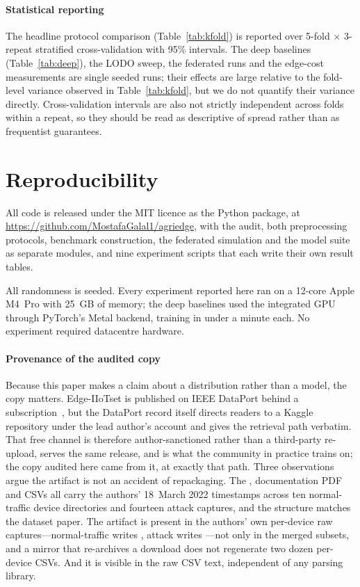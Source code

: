 \paragraph{Statistical reporting} The headline protocol comparison
(Table~\ref{tab:kfold}) is reported over 5-fold $\times$ 3-repeat stratified
cross-validation with 95\% intervals. The deep baselines
(Table~\ref{tab:deep}), the LODO sweep, the federated runs and the edge-cost
measurements are single seeded runs; their effects are large relative
to the fold-level variance observed in Table~\ref{tab:kfold}, but we do not
quantify their variance directly. Cross-validation intervals are also not
strictly independent across folds within a repeat, so they should be read as
descriptive of spread rather than as frequentist guarantees.

\section{Reproducibility}
\label{sec:repro}

All code is released under the MIT licence as the  Python
package, at \url{https://github.com/MostafaGalal1/agriedge}, with the audit,
both preprocessing protocols, benchmark construction, the federated simulation
and the model suite as separate modules, and nine experiment scripts that each
write their own result tables.

All randomness is seeded. Every experiment reported here ran on a 12-core Apple
M4~Pro with 25~GB of memory; the deep baselines used the integrated GPU through
PyTorch's Metal backend, training in under a minute each. No experiment
required datacentre hardware.

\paragraph{Provenance of the audited copy} Because this paper makes a claim
about a distribution rather than a model, the copy matters. Edge-IIoTset is
published on IEEE DataPort behind a subscription~\cite{ferrag2022dataport}, but
the DataPort record itself directs readers to a Kaggle repository under the
lead author's account and gives the retrieval path verbatim. That free channel
is therefore author-sanctioned rather than a third-party re-upload, serves the
same release, and is what the community in practice trains on; the copy audited
here came from it, at exactly that path. Three observations argue the artifact
is not an accident of repackaging. The , documentation PDF and
CSVs all carry the authors' 18~March 2022 timestamps across ten normal-traffic
device directories and fourteen attack captures, and the structure matches the
dataset paper. The artifact is present in the authors' own per-device raw
captures---normal-traffic writes , attack writes ---not only
in the merged subsets, and a mirror that re-archives a download does not
regenerate two dozen per-device CSVs. And it is visible in the raw CSV text,
independent of any parsing library.

